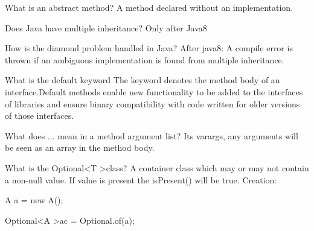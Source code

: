 \begin{flashcard}[Lang]{What is an abstract method?}
A method declared without an implementation.
\end{flashcard}

\begin{flashcard}[Lang]{Does Java have multiple inheritance?}
Only after Java8
\end{flashcard}

\begin{flashcard}[Lang]{How is the diamond problem handled in Java?}
After java8: A compile error is thrown if an ambiguous implementation is found from multiple inheritance.
\end{flashcard}

\begin{flashcard}[Lang]{What is the default keyword}
The keyword denotes the method body of an interface.Default methods enable new functionality to be added to the interfaces of libraries and ensure binary compatibility with code written for older versions of those interfaces.
\end{flashcard}

\begin{flashcard}[Lang]{What does ... mean in a method argument list?}
Its varargs, any arguments will be seen as an array in the method body.
\end{flashcard}

\begin{flashcard}[Lang]{What is the Optional\textless T \textgreater class?}
A container class which may or may not contain a non-null value. If value is present the isPresent() will be true. Creation:

A a = new A();

Optional\textless A \textgreater ac = Optional.of(a);
\end{flashcard}

